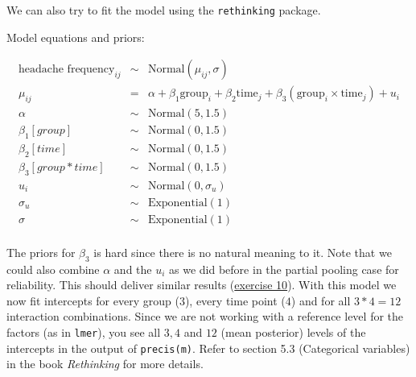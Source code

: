 \documentclass[
]{book}
\begin{document}
We can also try to fit the model using the \texttt{rethinking} package.

Model equations and priors:

\[
\begin{array}{rcl}
\text{headache frequency}_{ij} &\sim& \text{Normal}(\mu_{ij}, \sigma) \\
\mu_{ij} &=& \alpha + \beta_1 \text{group}_i + \beta_2 \text{time}_j + 
              \beta_3 (\text{group}_i \times \text{time}_j) + u_i\\
\alpha &\sim& \text{Normal}(5, 1.5) \\
\beta_1[group] &\sim& \text{Normal}(0, 1.5) \\
\beta_2[time] &\sim& \text{Normal}(0, 1.5) \\
\beta_3[group*time] &\sim& \text{Normal}(0, 1.5) \\ 
u_i &\sim& \text{Normal}(0, \sigma_u) \\
\sigma_u &\sim& \text{Exponential}(1) \\
\sigma &\sim& \text{Exponential}(1) \\
\end{array}
\]

The priors for \(\beta_3\) is hard since there is no natural meaning to it.
Note that we could also combine \(\alpha\) and the \(u_i\) as we did before in the
partial pooling case for reliability. This should deliver similar results
(\hyperref[exercise10_LMM]{exercise 10}).
With this model we now fit intercepts for every group (\(3\)),
every time point (\(4\)) and for all \(3*4=12\) interaction combinations.
Since we are not working with a reference level for the factors (as in \texttt{lmer}), you see
all \(3,4\) and \(12\) (mean posterior) levels of the intercepts in the output of \texttt{precis(m)}.
Refer to section 5.3 (Categorical variables) in the book \emph{Rethinking} for more details.
\end{document}
